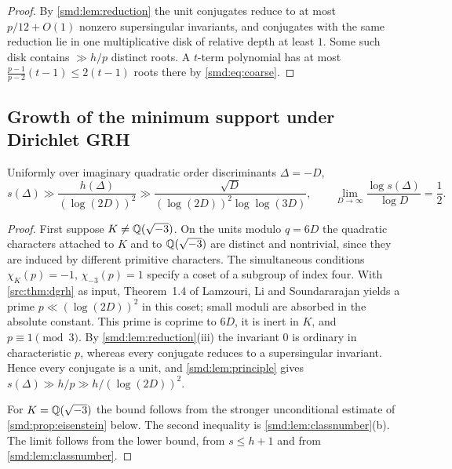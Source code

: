 
\begin{proof}
By \cref{smd:lem:reduction} the unit conjugates reduce to at most $p/12+O(1)$ nonzero
supersingular invariants, and conjugates with the same reduction lie in one multiplicative
disk of relative depth at least $1$. Some such disk contains $\gg h/p$ distinct roots.
A $t$-term polynomial has at most $\frac{p-1}{p-2}(t-1)\le2(t-1)$ roots there by
\eqref{smd:eq:coarse}.
\end{proof}

\subsection{Growth of the minimum support under Dirichlet GRH}\label{smd:sec:growth}
{\raggedright{}}

\begin{theorem}\label{smd:thm:growth}
Uniformly over imaginary quadratic order discriminants $\Delta=-D$,
\[
 s(\Delta)\gg\frac{h(\Delta)}{(\log(2D))^2}
 \gg\frac{\sqrt D}{(\log(2D))^2\log\log(3D)},
 \qquad
 \lim_{D\to\infty}\frac{\log s(\Delta)}{\log D}=\frac12 .
\]
\end{theorem}

\begin{proof}
First suppose $K\ne\mathbb{Q}(\sqrt{-3})$. On the units modulo $q=6D$ the quadratic characters
attached to $K$ and to $\mathbb{Q}(\sqrt{-3})$ are distinct and nontrivial, since they are induced
by different primitive characters. The simultaneous conditions $\chi_K(p)=-1$,
$\chi_{-3}(p)=1$ specify a coset of a subgroup of index four. With \cref{src:thm:dgrh} as
input, Theorem~1.4 of Lamzouri, Li and Soundararajan \cite{LamzouriLiSoundararajan2015Conditional} yields
a prime $p\ll(\log(2D))^2$ in this coset; small moduli are absorbed in the absolute
constant. This prime is coprime to $6D$, it is inert in $K$, and $p\equiv1\pmod3$. By
\cref{smd:lem:reduction}(iii) the invariant $0$ is ordinary in characteristic $p$, whereas
every conjugate reduces to a supersingular invariant. Hence every conjugate is a unit, and
\cref{smd:lem:principle} gives $s(\Delta)\gg h/p\gg h/(\log(2D))^2$.

For $K=\mathbb{Q}(\sqrt{-3})$ the bound follows from the stronger unconditional estimate of
\cref{smd:prop:eisenstein} below. The second inequality is
\cref{smd:lem:classnumber}(b). The limit follows from the lower bound, from
$s\le h+1$ and from \cref{smd:lem:classnumber}.
\end{proof}

